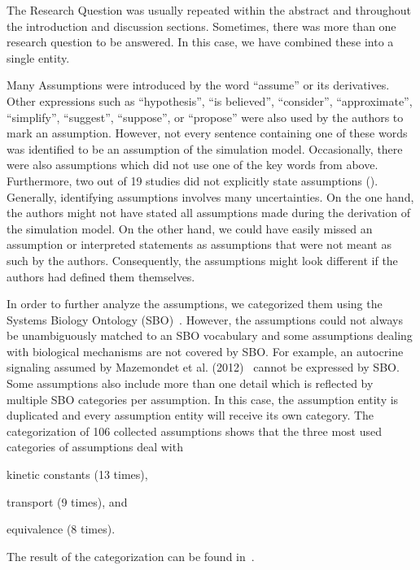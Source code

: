 \documentclass[10pt,letterpaper]{article}
\newcommand{\RQ}{Research Question}
\newcommand{\As}{Assumptions}
\begin{document}

The \RQ{} was usually repeated within the abstract and throughout the introduction and discussion sections.
Sometimes, there was more than one research question to be answered.
In this case, we have combined these into a single entity.

Many \As{} were introduced by the word \enquote{assume} or its derivatives.
Other expressions such as \enquote{hypothesis}, \enquote{is believed}, \enquote{consider}, \enquote{approximate}, \enquote{simplify}, \enquote{suggest}, \enquote{suppose}, or \enquote{propose} were also used by the authors to mark an assumption.
However, not every sentence containing one of these words was identified to be an assumption of the simulation model.
Occasionally, there were also assumptions which did not use one of the key words from above.
Furthermore, two out of 19 studies did not explicitly state assumptions (\cite{Kruger2004, Padala2017}).
Generally, identifying assumptions involves many uncertainties.
On the one hand, the authors might not have stated all assumptions made during the derivation of the simulation model.
On the other hand, we could have easily missed an assumption or interpreted statements as assumptions that were not meant as such by the authors.
Consequently, the assumptions might look different if the authors had defined them themselves.

In order to further analyze the assumptions, we categorized them using the Systems Biology Ontology (SBO)~\cite{Courtot2011}.
However, the assumptions could not always be unambiguously matched to an SBO vocabulary and some assumptions dealing with biological mechanisms are not covered by SBO.
For example, an autocrine signaling assumed by Mazemondet et al. (2012)~\cite{Mazemondet2012} cannot be expressed by SBO.
Some assumptions also include more than one detail which is reflected by multiple SBO categories per assumption.
In this case, the assumption entity is duplicated and every assumption entity will receive its own category.
The categorization of 106 collected assumptions shows that the three most used categories of assumptions deal with
\begin{inparaenum}
\item[] kinetic constants (13 times),
\item[] transport (9 times), and
\item[] equivalence (8 times).
\end{inparaenum}
The result of the categorization can be found in~.
\end{document}
